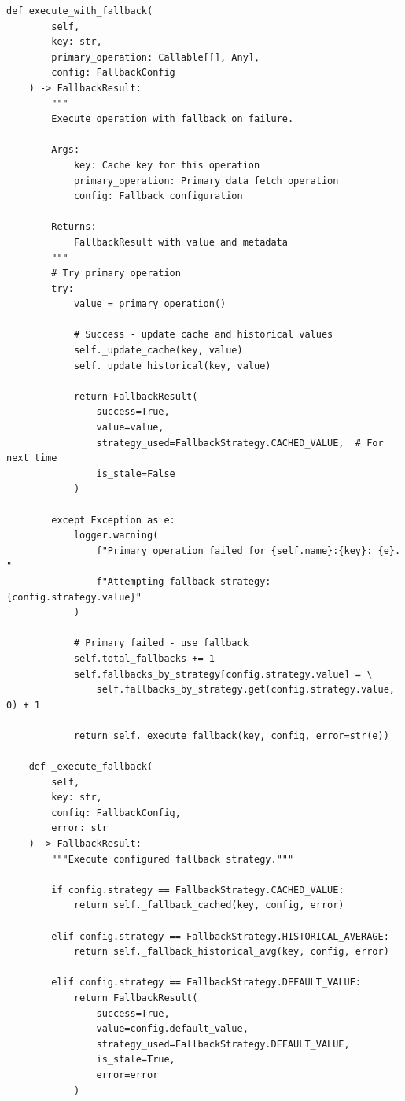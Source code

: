 \begin{lstlisting}[style=python, caption={Fallback Manager for Graceful Degradation}]
    def execute_with_fallback(
        self,
        key: str,
        primary_operation: Callable[[], Any],
        config: FallbackConfig
    ) -> FallbackResult:
        """
        Execute operation with fallback on failure.

        Args:
            key: Cache key for this operation
            primary_operation: Primary data fetch operation
            config: Fallback configuration

        Returns:
            FallbackResult with value and metadata
        """
        # Try primary operation
        try:
            value = primary_operation()

            # Success - update cache and historical values
            self._update_cache(key, value)
            self._update_historical(key, value)

            return FallbackResult(
                success=True,
                value=value,
                strategy_used=FallbackStrategy.CACHED_VALUE,  # For next time
                is_stale=False
            )

        except Exception as e:
            logger.warning(
                f"Primary operation failed for {self.name}:{key}: {e}. "
                f"Attempting fallback strategy: {config.strategy.value}"
            )

            # Primary failed - use fallback
            self.total_fallbacks += 1
            self.fallbacks_by_strategy[config.strategy.value] = \
                self.fallbacks_by_strategy.get(config.strategy.value, 0) + 1

            return self._execute_fallback(key, config, error=str(e))

    def _execute_fallback(
        self,
        key: str,
        config: FallbackConfig,
        error: str
    ) -> FallbackResult:
        """Execute configured fallback strategy."""

        if config.strategy == FallbackStrategy.CACHED_VALUE:
            return self._fallback_cached(key, config, error)

        elif config.strategy == FallbackStrategy.HISTORICAL_AVERAGE:
            return self._fallback_historical_avg(key, config, error)

        elif config.strategy == FallbackStrategy.DEFAULT_VALUE:
            return FallbackResult(
                success=True,
                value=config.default_value,
                strategy_used=FallbackStrategy.DEFAULT_VALUE,
                is_stale=True,
                error=error
            )


\end{lstlisting}

